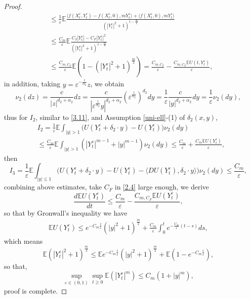 \documentclass[11pt,reqno]{amsart}
\numberwithin{equation}{section}
\newcommand{\de}{\delta}
\begin{document}
\begin{proof}
\begin{align*}
& \leq\frac{1}{\varepsilon} \mathbb{E}  \frac{\langle  f(X_{t}^{\varepsilon},Y_{t}^{\varepsilon})-f(X_{t}^{\varepsilon},0),mY_{t}^{\varepsilon}\rangle  +\langle  f(X_{t}^{\varepsilon},0),mY_{t}^{\varepsilon}\rangle }{(|Y_{t}^{\varepsilon}|^{2}+1)^{1-\frac{m}{2}}}\\
&\leq  \frac{C_{m}}{\varepsilon}\mathbb{E} \frac{C_{3}|Y_{t}^{\varepsilon}|-C_{F}|Y_{t}^{\varepsilon}|^{2}}{(|Y_{t}^{\varepsilon}|^{2}+1)^{1-\frac{m}{2}}}\\
&\leq \frac{C_{m,C_{F}}}{\varepsilon}\mathbb{E}\left( 1-(|Y_{t}^{\varepsilon}|^{2}+1)^{\frac{m}{2}}\right)=\frac{C_{m,C_{F}}}{\varepsilon}-\frac{C_{m,C_F}\mathbb{E}U(t,Y_{t}^{\varepsilon})}{\varepsilon},  
\end{align*}
	in addition, taking $y=\varepsilon^{-\frac{1}{\alpha_{2}}}z$,  we obtain 
\begin{equation*}
		\nu_{2}(dz)=\frac{c}{|z|^{d_2+\alpha_{2}}}dz=\frac{c}{|\varepsilon^{\frac{1}{\alpha_{2}}}y|^{d_2+\alpha_{2}}}(\varepsilon^{\frac{1}{\alpha_{2}}})^{d_2}dy=\frac{1}{\varepsilon}\frac{c}{|y|^{d_2+\alpha_{2}}}dy=\frac{1}{\varepsilon}\nu_{2}(dy),		
\end{equation*}	
thus for $I_{2}$, similar to \eqref{3.11}, and Assumption \ref{uni-ell}-(1) of $ \delta_{2}(x,y)$,
\begin{align*}
		&I_{2}=\frac{1}{\varepsilon}\mathbb{E} \int_{|y|> 1}\big( U(Y_{t}^{\varepsilon}+\de_2\cdot y)-U(Y_{t}^{\varepsilon}) \big) \nu_{2}(dy) \\
		&\leq  \frac{C_{m}}{\varepsilon}\mathbb{E}\int_{|y|> 1}\left(|Y_{t}^{\varepsilon}|^{m-1}+|y|^{m-1} \right) \nu_{2}(dy) \leq\frac{C_{m}}{\varepsilon}+\frac{C_{m}\mathbb{E}U(Y_{t}^{\varepsilon})}{\varepsilon},  
\end{align*}
then 
\begin{equation*}
I_{3}=\frac{1}{\varepsilon}\mathbb{E} \int_{|y|\leq 1}\big( U(Y_{t}^{\varepsilon}+\de_2\cdot y)-U(Y_{t}^{\varepsilon})-\langle  DU(Y_{t}^{\varepsilon}),\de_2\cdot y\rangle  \big) \nu_{2}(dy)\leq  \frac{C_{m}}{\varepsilon},  
\end{equation*}
	combining above estimates, take $C_F$ in \eqref{2.4} large enough, we derive
\begin{equation*}
\frac{d\mathbb{E}U(Y_{t}^{\varepsilon})}{dt}\leq\frac{C_{m}}{\varepsilon}-\frac{C_{m,C_F}\mathbb{E}U(Y_{t}^{\varepsilon})}{\varepsilon},
\end{equation*}
so that by Gronwall's inequality we have 
\begin{align*}
	\mathbb{E}U(Y_{t}^{\varepsilon})\leq e^{-C_{m}\frac{t}{\varepsilon}}(|y|^{2}+1)^{\frac{m}{2}}+\frac{C_{m}}{\varepsilon} \int^{t}_{0}e^{-\frac{C_{m}}{\varepsilon}(t-s)}ds,
\end{align*}
which means
$$\mathbb{E}(|Y_{t}^{\varepsilon}|^{2}+1)^{\frac{m}{2}}\leq \mathbb{E}e^{-C_{m}\frac{t}{\varepsilon}}(|y|^{2}+1)^{\frac{m}{2}}+\mathbb{E}(1-e^{-C_{m}\frac{t}{\varepsilon}}),$$
so that,
\begin{equation*}
	\sup\limits_{\varepsilon\in (0,1)}\sup\limits_{t\geq0} \mathbb{E}\left(|Y_{t}^{\varepsilon}|^{m}\right)\leq C_{m}(1+|y|^{m}),
\end{equation*}
proof is complete.
\end{proof}
\end{document}
